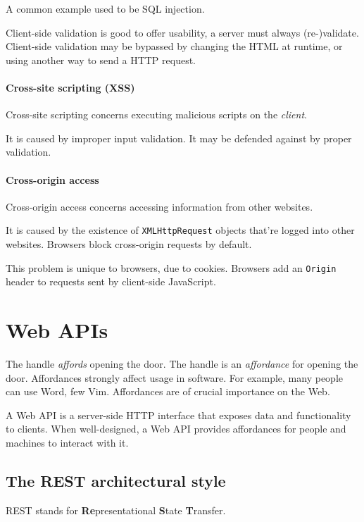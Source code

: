 \documentclass{report}
\begin{document}
A common example used to be SQL injection.

Client-side validation is good to offer usability,
a server must always (re-)validate.
Client-side validation may be bypassed by
changing the HTML at runtime,
or using another way to send a HTTP request.

\subsubsection{Cross-site scripting (XSS)}

Cross-site scripting concerns executing
malicious scripts on the \emph{client}.

It is caused by improper input validation.
It may be defended against by proper validation.

\subsubsection{Cross-origin access}

Cross-origin access concerns accessing
information from other websites.

It is caused by the existence of \texttt{XMLHttpRequest}
objects that're logged into other websites.
Browsers block cross-origin requests by default.

This problem is unique to browsers, due to cookies.
Browsers add an \texttt{Origin} header
to requests sent by client-side JavaScript.

\chapter{Web APIs}

The handle \emph{affords} opening the door.
The handle is an \emph{affordance} for opening the door.
Affordances strongly affect usage in software.
For example, many people can use Word, few Vim.
Affordances are of crucial importance on the Web.

A Web API is a server-side HTTP interface
that exposes data and functionality to clients.
When well-designed, a Web API provides affordances
for people and machines to interact with it.

\section{The REST architectural style}

REST stands for
\textbf{Re}presentational \textbf{S}tate \textbf{T}ransfer.
\end{document}
